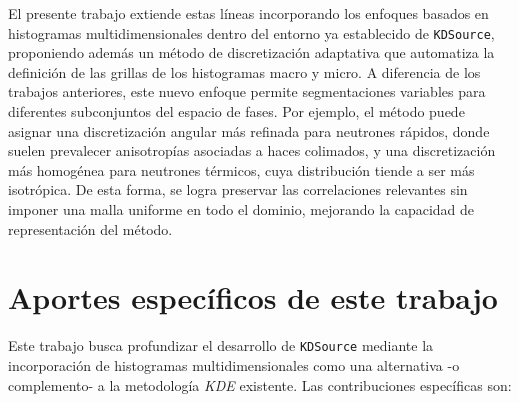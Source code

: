 El presente trabajo extiende estas líneas incorporando los enfoques basados en histogramas multidimensionales dentro del entorno ya establecido de \texttt{KDSource}, proponiendo además un método de discretización adaptativa que automatiza la definición de las grillas de los histogramas macro y micro. A diferencia de los trabajos anteriores, este nuevo enfoque permite segmentaciones variables para diferentes subconjuntos del espacio de fases. Por ejemplo, el método puede asignar una discretización angular más refinada para neutrones rápidos, donde suelen prevalecer anisotropías asociadas a haces colimados, y una discretización más homogénea para neutrones térmicos, cuya distribución tiende a ser más isotrópica. De esta forma, se logra preservar las correlaciones relevantes sin imponer una malla uniforme en todo el dominio, mejorando la capacidad de representación del método.

\section{Aportes específicos de este trabajo}

Este trabajo busca profundizar el desarrollo de \texttt{KDSource} mediante la incorporación de histogramas multidimensionales como una alternativa -o complemento- a la metodología \textit{KDE} existente. Las contribuciones específicas son:

